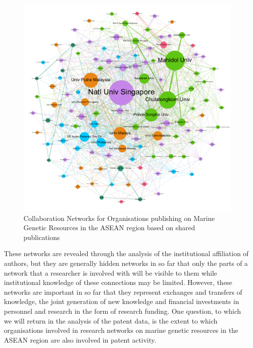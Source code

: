 \documentclass[]{book}
\theoremstyle{definition}
\theoremstyle{definition}
\theoremstyle{definition}
\theoremstyle{remark}
\begin{document}
\begin{figure}

{\centering \includegraphics[width=1\linewidth]{images/aseanmarinlit_organisations_gephi} 

}

\caption{Collaboration Networks for Organisations publishing on Marine Genetic Resources in the ASEAN region based on shared publications}\label{fig:organisationnetwork}
\end{figure}

These networks are revealed through the analysis of the institutional
affiliation of authors, but they are generally hidden networks in so far
that only the parts of a network that a researcher is involved with will
be visible to them while institutional knowledge of these connections
may be limited. However, these networks are important in so far that
they represent exchanges and transfers of knowledge, the joint
generation of new knowledge and financial investments in personnel and
research in the form of research funding. One question, to which we will
return in the analysis of the patent data, is the extent to which
organisations involved in research networks on marine genetic resources
in the ASEAN region are also involved in patent activity.
\end{document}
